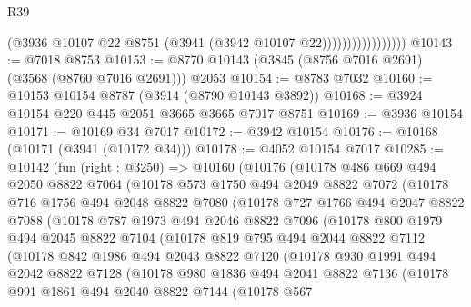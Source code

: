 \begin{lexlean}{R39}
\begin{coremodule}
                                (@3936 @10107 @22 @8751 (@3941 (@3942 @10107 @22)))))))))))))))))
@10143 := @7018 @8753
@10153 := @8770 @10143 (@3845 (@8756 @7016 @2691) (@3568 (@8760 @7016 @2691))) @2053
@10154 := @8783 @7032
@10160 := @10153 @10154 @8787 (@3914 (@8790 @10143 @3892))
@10168 := @3924 @10154 @220 @445 @2051 @3665 @3665 @7017 @8751
@10169 := @3936 @10154
@10171 := @10169 @34 @7017
@10172 := @3942 @10154
@10176 := @10168 (@10171 (@3941 (@10172 @34)))
@10178 := @4052 @10154 @7017
@10285 := @10142
    (fun (right : @3250) =>
    @10160
      (@10176
        (@10178
          @486
          @669
          @494
          @2050
          @8822
          @7064
          (@10178
            @573
            @1750
            @494
            @2049
            @8822
            @7072
            (@10178
              @716
              @1756
              @494
              @2048
              @8822
              @7080
              (@10178
                @727
                @1766
                @494
                @2047
                @8822
                @7088
                (@10178
                  @787
                  @1973
                  @494
                  @2046
                  @8822
                  @7096
                  (@10178
                    @800
                    @1979
                    @494
                    @2045
                    @8822
                    @7104
                    (@10178
                      @819
                      @795
                      @494
                      @2044
                      @8822
                      @7112
                      (@10178
                        @842
                        @1986
                        @494
                        @2043
                        @8822
                        @7120
                        (@10178
                          @930
                          @1991
                          @494
                          @2042
                          @8822
                          @7128
                          (@10178
                            @980
                            @1836
                            @494
                            @2041
                            @8822
                            @7136
                            (@10178
                              @991
                              @1861
                              @494
                              @2040
                              @8822
                              @7144
                              (@10178
                                @567

\end{coremodule}
\end{lexlean}
